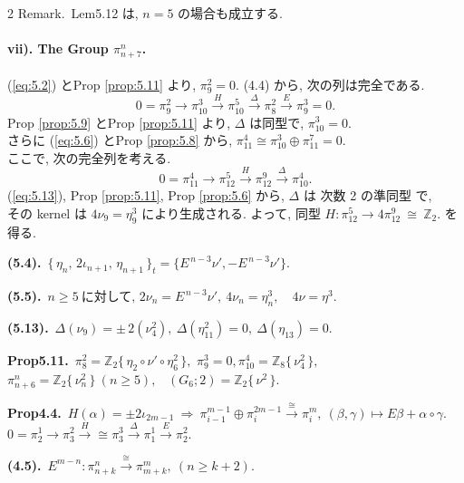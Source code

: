 \documentclass[10pt, leqno]{ltjsarticle}
\newcommand{\xto}{\mathrel{\xrightarrow{}}}
\newcommand{\todai}[2][]{\{\,#2\,\}_{#1}}      %
\newcommand{\gen}[1]{\{\,#1\,\}}       %
\newcommand{\pit}[2]{\pi_{#1}^{#2}}
\numberwithin{equation}{section}
\theoremstyle{plain}
\theoremstyle{definition}
\theoremstyle{remark}
\begin{document}
\begin{paracol}{2}
Remark.\  Lem5.12 は, \(n=5\) の場合も成立する. 


\paragraph*{vii). The Group \(\pi^{n}_{n+7}\).}

(\ref{eq:5.2}) とProp \ref{prop:5.11} より,
\(\pi^{2}_{9}=0\). 
(4.4) から, 次の列は完全である. 
\[
0=\pi^{2}_{9}\xto
\pi^{3}_{10}\xrightarrow{H}
\pi_{10}^5\xrightarrow{\Delta}
\pi^{2}_{8}\xrightarrow{E}\pi^{3}_{9}=0 .
\]
Prop \ref{prop:5.9} とProp \ref{prop:5.11} より,
\(\Delta\) は同型で, 
\(\pi^{3}_{10}=0\). \\
さらに (\ref{eq:5.6}) とProp \ref{prop:5.8} から, 
\(\pi^{4}_{11}\cong \pi^{3}_{10}\oplus \pi^{7}_{11}=0\). \\
ここで, 次の完全列を考える. 
\[
0=\pi^{4}_{11}\xto\pi^{5}_{12}\xrightarrow{H}
\pi^{9}_{12}\xrightarrow{\Delta}\pi^{4}_{10} .
\]
(\ref{eq:5.13}), Prop \ref{prop:5.11}, Prop \ref{prop:5.6} から, 
\(\Delta\) は 次数 2 の準同型 で, \\
その kernel は \(4\nu_9=\eta_9^{3}\) により生成される.
よって, 同型 
\(H:\pi^{5}_{12}\xrightarrow{}4\pi^{9}_{12}\ \cong\ \mathbb Z_2 .\)
を得る. 

\switchcolumn

\noindent
\textbf{(5.4).}\
\(\todai[t]{\eta_{n},\,2\iota_{n+1},\,\eta_{n+1}} = \{E^{\,n-3}\nu',-E^{\,n-3}\nu'\}.\)

\noindent
\textbf{(5.5).}\
\(n\ge5\ \text{に対して, } 2\nu_n=E^{\,n-3}\nu',\
4\nu_{n}=\eta_n^{3},\quad 4\nu=\eta^{3}.\)

\noindent
\textbf{(5.13).}\
\(\Delta(\nu_9)=\pm\,2(\nu_4^{2}),\
\Delta(\eta^{2}_{11})=0,\
\Delta(\eta_{13})=0.\)

\noindent
\textbf{Prop5.11.}\
\(\pi^{2}_{8}=\mathbb Z_2\gen{\eta_{2}\circ\nu'\circ\eta_6^2},\)\quad 
\(\pi^{3}_{9}=0,\)\quad \(\pi^{4}_{10}=\mathbb Z_8\gen{\nu_{4}^2},\) \\
\(\pi^{n}_{n+6}=\mathbb Z_2\gen{\nu_n^2}\ (n\ge5),\) \
\((G_{6};2)=\mathbb Z_2\gen{\nu^2}.\)

\noindent
\textbf{Prop4.4.}\
\(H(\alpha) = \pm 2\iota_{2m-1}\ \Longrightarrow\
\pit{i-1}{m-1}\oplus\pit{i}{2m-1}\xrightarrow{\cong}\pit{i}{m},\
(\beta,\gamma)\mapsto E\beta+\alpha\circ\gamma.\)\\
\(0=\pit{2}{1}\to\pit{3}{2}
\xrightarrow{H}{\cong}\pit{3}{3}
\xrightarrow{\Delta}\pit{1}{1}
\xrightarrow{E}\pit{2}{2}.\)

\noindent
\textbf{(4.5).}\
\(E^{m-n}:\pit{n+k}{n}\xrightarrow{\cong}\pit{m+k}{m},\
(n\ge k+2). \)


\end{paracol}
\end{document}
